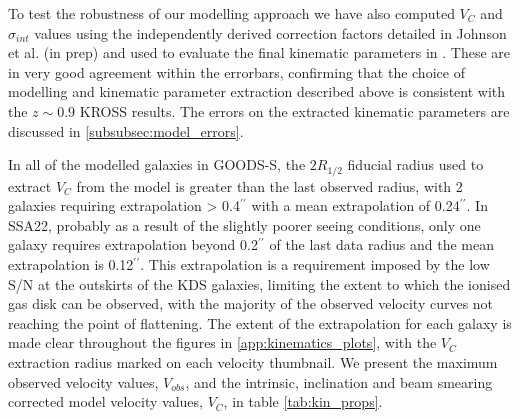 \documentclass[fleqn,usenatbib]{mn2e}
\begin{document}
To test the robustness of our modelling approach we have also computed $V_{C}$ and $\sigma_{int}$ values using the independently derived correction factors detailed in Johnson et al. (in prep) and used to evaluate the final kinematic parameters in \cite{Harrison2017}.
These are in very good agreement within the errorbars, confirming that the choice of modelling and kinematic parameter extraction described above is consistent with the $z\sim0.9$ KROSS results.
The errors on the extracted kinematic parameters are discussed in \cref{subsubsec:model_errors}.

In all of the modelled galaxies in GOODS-S, the $2R_{1/2}$ fiducial radius used to extract $V_{C}$ from the model is greater than the last observed radius, with 2 galaxies requiring extrapolation > 0.4$^{\prime\prime}$ with a mean extrapolation of 0.24$^{\prime\prime}$.
In SSA22, probably as a result of the slightly poorer seeing conditions, only one galaxy requires extrapolation beyond 0.2$^{\prime\prime}$ of the last data radius and the mean extrapolation is 0.12$^{\prime\prime}$.
This extrapolation is a requirement imposed by the low S/N at the outskirts of the KDS galaxies, limiting the extent to which the ionised gas disk can be observed, with the majority of the observed velocity curves not reaching the point of flattening. 
The extent of the extrapolation for each galaxy is made clear throughout the figures in \cref{app:kinematics_plots}, with the $V_{C}$ extraction radius marked on each velocity thumbnail.
We present the maximum observed velocity values, $V_{obs}$, and the intrinsic, inclination and beam smearing corrected model velocity values, $V_{C}$, in table \ref{tab:kin_props}.
\end{document}
